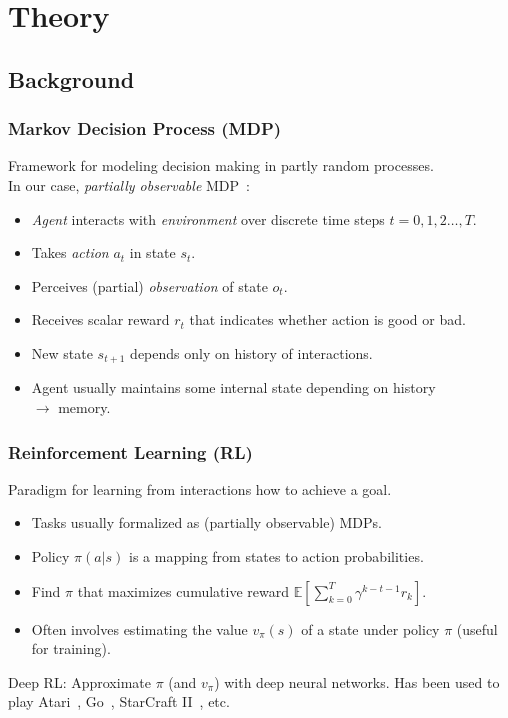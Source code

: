 \section{Theory}

\subsection{Background}

\begin{frame}
    \frametitle{Markov Decision Process (MDP)}
    
    Framework for modeling decision making in partly random processes.\\
    In our case, \textit{partially observable} MDP~\cite{kaelbling_planning_1998}:

    \begin{itemize}
        \item \textit{Agent} interacts with \textit{environment} over discrete time steps \(t = 0, 1, 2\dots, T\).
        \item Takes \textit{action} \(a_t\) in state \(s_t\).
        \item Perceives (partial) \textit{observation} of state \(o_t\).
        \item Receives scalar reward \(r_t\) that indicates whether action is good or bad.
        \item New state \(s_{t+1}\) depends only on history of interactions.
        \item Agent usually maintains some internal state depending on history \\
        \(\rightarrow\) memory.
    \end{itemize}

    \begin{figure}
        \centering
        \scalebox{0.75}{}
    \end{figure}
\end{frame}

\begin{frame}
    \frametitle{Reinforcement Learning (RL)}

    Paradigm for learning from interactions how to achieve a goal.

    \begin{itemize}
        \item Tasks usually formalized as (partially observable) MDPs.
        \item Policy \(\pi(a|s)\) is a mapping from states to action probabilities.
        \item Find \(\pi\) that maximizes cumulative reward \(\mathbb{E} \left\lbrack \sum_{k=0}^{T} \gamma^{k-t-1} r_k \right\rbrack\).
        \item Often involves estimating the value \(v_\pi(s)\) of a state under policy \(\pi\) (useful for training). 
    \end{itemize}

    Deep RL: Approximate \(\pi\) (and \(v_\pi\)) with deep neural networks.
    Has been used to play Atari~\cite{mnih_human-level_2015}, Go~\cite{silver_mastering_2016}, StarCraft II~\cite{vinyals_grandmaster_2019}, etc.
\end{frame}

